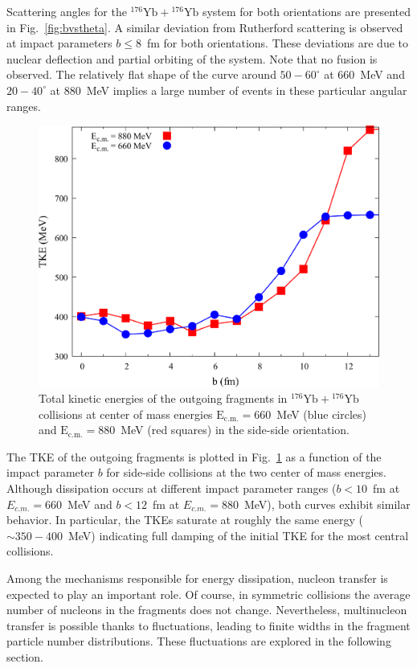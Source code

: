 Scattering angles for the $^{176}\mathrm{Yb}+{}^{176}\mathrm{Yb}$ system for both orientations are presented in Fig.~\ref{fig:bvstheta}. 
A similar deviation from Rutherford scattering is observed at impact parameters $b\le8$~fm for both orientations. 
These deviations are due to nuclear deflection and partial orbiting of the system.
Note that no fusion is observed.
The relatively flat shape of the curve around $50-60^\circ$ at 660~MeV and $20-40^\circ$ at 880~MeV implies a large number of events in these particular angular ranges.

\begin{figure}
	\includegraphics*[width=\textwidth]{../Figures/YbYb/TKEL.pdf}
	\caption{Total kinetic energies of the outgoing fragments in $^{176}\mathrm{Yb}+{}^{176}\mathrm{Yb}$ collisions at center of mass energies $\mathrm{E_{c.m.}}=660$~MeV (blue circles) and $\mathrm{E_{c.m.}}=880$~MeV (red squares) in the side-side orientation.}
	\label{fig:tke}
\end{figure}

The TKE of the outgoing fragments is plotted in Fig.~\ref{fig:tke} 
as a function of the impact parameter $b$ for side-side collisions at the two center of mass energies.
Although dissipation occurs at different impact parameter ranges ($b<10$~fm at $E_{c.m.}=660$~MeV and $b<12$~fm at $E_{c.m.}=880$~MeV), both curves exhibit similar behavior.
In particular, the TKEs saturate at roughly the same energy ($\sim350-400$~MeV) indicating full damping of the initial TKE for the most central collisions.

Among the mechanisms responsible for energy dissipation, nucleon transfer is expected to play an important role. 
Of course, in symmetric collisions the average number of nucleons in the fragments does not change.
Nevertheless, multinucleon transfer is possible thanks to fluctuations, leading to finite widths in the fragment particle number distributions. 
These fluctuations are explored in the following section.

